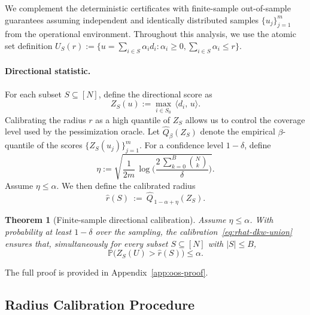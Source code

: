 \documentclass[accepted]{uai2026}
\theoremstyle{plain}
\newtheorem{theorem}{Theorem}[section]
\theoremstyle{definition}
\theoremstyle{remark}
\begin{document}
We complement the deterministic certificates with finite-sample out-of-sample guarantees assuming independent and identically distributed samples $\{u_j\}_{j=1}^m$ from the operational environment. Throughout this analysis, we use the atomic set definition $U_S(r) := \{u=\sum_{i\in S}\alpha_i d_i: \alpha_i\ge 0, \sum_{i\in S}\alpha_i\le r\}$.

\paragraph{Directional statistic.}
For each subset $S\subseteq[N]$, define the directional score as
\[
Z_S(u) := \max_{i\in S_0}\,\langle d_i,\,u\rangle .
\]
Calibrating the radius $r$ as a high quantile of $Z_S$ allows us to control the coverage level used by the pessimization oracle. Let $\widehat Q_{\beta}(Z_S)$ denote the empirical $\beta$-quantile of the scores $\{Z_S(u_j)\}_{j=1}^m$. For a confidence level $1-\delta$, define
\[
\eta := \sqrt{\frac{1}{2m}\,\log\!\Big(\frac{2\,\sum_{k=0}^{B}\binom{N}{k}}{\delta}\Big)}.
\]
Assume $\eta\le \alpha$. We then define the calibrated radius
\begin{equation}
\label{eq:rhat-dkw-union}
\widehat r(S)\ :=\ \widehat Q_{\,1-\alpha+\eta}(Z_S).
\end{equation}


\begin{theorem}[Finite-sample directional calibration]
\label{thm:oos-feas}
Assume $\eta \le \alpha$. With probability at least $1-\delta$ over the sampling, the calibration~\eqref{eq:rhat-dkw-union} ensures that, simultaneously for every subset $S \subseteq [N]$ with $|S| \le B$,
\[
\mathbb{P}\bigl(Z_S(U) > \hat r(S)\bigr) \le \alpha .
\]
\end{theorem}

The full proof is provided in Appendix~\ref{app:oos-proof}.

\subsection{Radius Calibration Procedure}
\label{subsec:integration}
\end{document}
